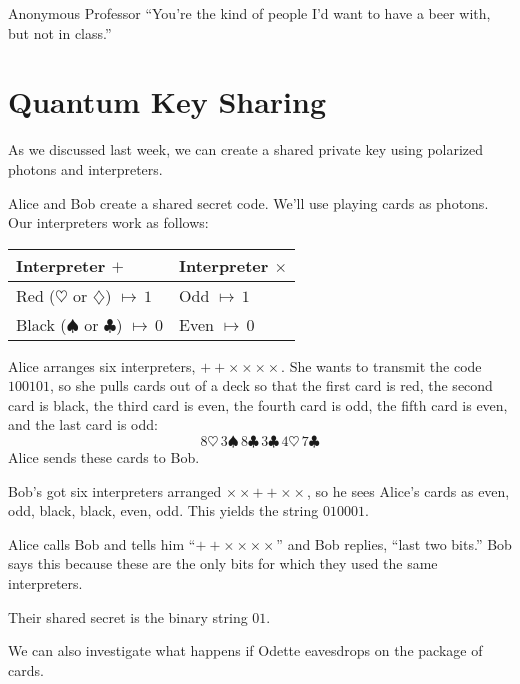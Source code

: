\begin{chapquote}{Anonymous Professor}
``You're the kind of people I'd want to have a beer with, but not in class.''
\end{chapquote}

\section{Quantum Key Sharing}

As we discussed last week, we can create a shared private key using polarized photons and interpreters.

\begin{example} Alice and Bob create a shared secret code.  We'll use playing cards as photons.  Our interpreters work as follows:

\begin{center}
\begin{tabular}{l | l}
Interpreter $+$ & Interpreter $\times$ \\
\hline
Red ($\heartsuit$ or $\diamondsuit$) $\mapsto \, 1$ & Odd $\mapsto \, 1$ \\
Black ($\spadesuit$ or $\clubsuit$) $\mapsto \, 0$ & Even $\mapsto \, 0$
\end{tabular}
\end{center}

Alice arranges six interpreters, $++\times\times\times\times$.  She wants to transmit the code $100101$, so she pulls cards out of a deck so that the first card is red, the second card is black, the third card is even, the fourth card is odd, the fifth card is even, and the last card is odd: \[
8\heartsuit \, 3 \spadesuit \, 8 \clubsuit \, 3 \clubsuit \, 4 \heartsuit \, 7 \clubsuit
\]
Alice sends these cards to Bob.

Bob's got six interpreters arranged $\times\times++\times\times$, so he sees Alice's cards as even, odd, black, black, even, odd.  This yields the string $010001$.

Alice calls Bob and tells him ``$++\times\times\times\times$'' and Bob replies, ``last two bits.'' Bob says this because these are the only bits for which they used the same interpreters.

Their shared secret is the binary string $01$.
\end{example}

We can also investigate what happens if Odette eavesdrops on the package of cards.

